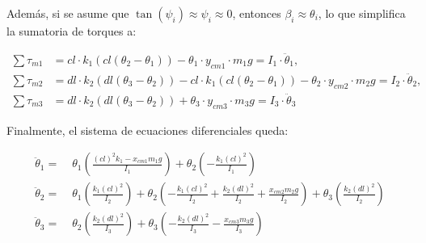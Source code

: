 Además, si se asume que \(\tan(\psi_i) \approx \psi_i \approx 0\), entonces \(\beta_i \approx \theta_i\), lo que simplifica la sumatoria de torques a:

\begin{align*}
\sum \tau_{m1} &= cl \cdot k_1 (cl(\theta_2 - \theta_1)) - \theta_1 \cdot y_{cm1} \cdot m_1 g = I_1 \cdot \ddot{\theta}_1, \\
\sum \tau_{m2} &= dl \cdot k_2 (dl(\theta_3 - \theta_2)) - cl \cdot k_1 (cl(\theta_2 - \theta_1)) - \theta_2 \cdot y_{cm2} \cdot m_2 g = I_2 \cdot \ddot{\theta}_2, \\
\sum \tau_{m3} &= dl \cdot k_2 (dl(\theta_3 - \theta_2)) + \theta_3 \cdot y_{cm3} \cdot m_3 g = I_3 \cdot \ddot{\theta}_3
\end{align*}

Finalmente, el sistema de ecuaciones diferenciales queda:

\begin{equation}
\begin{aligned}
\ddot{\theta}_1 =\; & \theta_1 \left( \frac{(cl)^2 k_{1} - x_{cm1} m_1 g}{I_1} \right) + \theta_2 \left( -\frac{k_1 (cl)^2}{I_1} \right) \\
\ddot{\theta}_2 =\; & \theta_1 \left( \frac{k_1 (cl)^2}{I_2} \right) + \theta_2 \left( -\frac{k_1 (cl)^2}{I_2} + \frac{k_2 (dl)^2}{I_2} + \frac{x_{cm2} m_2 g}{I_2} \right) + \theta_3 \left( \frac{k_2 (dl)^2}{I_2} \right) \\
\ddot{\theta}_3 =\; & \theta_2 \left( \frac{k_2 (dl)^2}{I_3} \right) + \theta_3 \left( -\frac{k_2 (dl)^2}{I_3} - \frac{x_{cm3} m_3 g}{I_3} \right)
\end{aligned}
\end{equation}

